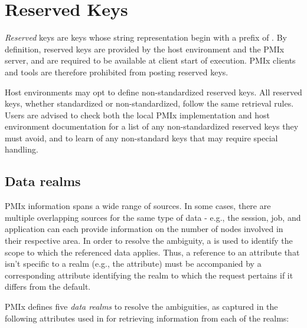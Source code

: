 \chapter{Reserved Keys}
\label{chap:api_rsvd_keys}


\emph{Reserved} keys are keys whose string representation begin with a prefix of
. By definition, reserved keys are provided by the host
environment and the \ac{PMIx} server, and are required to be available at client
start of execution. \ac{PMIx} clients and tools are therefore prohibited from
posting reserved keys.


Host environments may opt to define non-standardized reserved keys. 
All reserved keys, whether standardized or non-standardized, follow the same retrieval rules.
Users
are advised to check both the local \ac{PMIx} implementation and host environment documentation
for a list of any non-standardized reserved keys they must avoid, and to learn of any non-standard keys that may require special handling.


\section{Data realms}
\label{api:struct:attributes:retrieval}

\ac{PMIx} information spans a wide range of sources. In some cases,
there are multiple overlapping sources for the same type of data - e.g., the
session, job, and application can each provide information on the number of
nodes involved in their respective area. In order to resolve the ambiguity,
a 
is used to identify the scope to which the referenced data applies. Thus, a reference
to an attribute that isn't specific to a realm (e.g., the
 attribute) must be accompanied by a corresponding
attribute identifying the realm to which the request pertains if it differs
from the default.

\ac{PMIx} defines five \emph{data realms} to resolve the ambiguities, as
captured in the following attributes used in  for retrieving
information from each of the realms:

